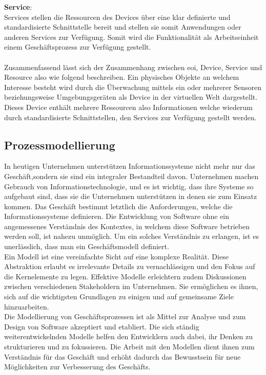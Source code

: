 \documentclass[a4paper, 12pt, twoside, headsepline=true]{scrartcl} %
\begin{document}
\textbf{Service}: \\
Services stellen die Ressourcen des Devices über eine klar definierte und standardisierte Schnittstelle bereit und stellen sie somit Anwendungen oder anderen Services zur Verfügung. Somit wird die Funktionalität als Arbeitseinheit einem Geschäftsprozess zur Verfügung gestellt.
\\
\\
Zusammenfassend lässt sich der Zusammenhang zwischen \ac{eoi}, Device, Service und Resource also wie folgend beschreiben. Ein physisches Objekte an welchem Interesse besteht wird durch die Überwachung mittels ein oder mehrerer Sensoren beziehungsweise Umgebungsgeräten als Device in der virtuellen Welt dargestellt. Dieses Device enthält mehrere Ressourcen also Informationen welche wiederum durch standardisierte Schnittstellen, den Services zur Verfügung gestellt werden.

\subsection{Prozessmodellierung}\label{modellierung}

In heutigen Unternehmen unterstützen Informationssysteme nicht mehr nur das Geschäft,sondern sie sind ein integraler Bestandteil davon. Unternehmen machen Gebrauch von Informationstechnologie, und es ist wichtig, dass ihre Systeme so aufgebaut sind, dass sie die Unternehmen unterstützen in denen sie zum Einsatz kommen. Das Geschäft bestimmt letztlich die Anforderungen, welche die Informationssysteme definieren. Die Entwicklung von Software ohne ein angemessenes Verständnis des Kontextes, in welchem diese Software betrieben werden soll, ist nahezu unmöglich. Um ein solches Verständnis zu erlangen, ist es unerlässlich, dass man ein Geschäftsmodell definiert.\\
 Ein Modell ist eine vereinfachte Sicht auf eine komplexe Realität. Diese Abstraktion erlaubt es irrelevante Details zu vernachlässigen und den Fokus auf die Kernelemente zu legen. Effektive Modelle erleichtern zudem
Diskussionen zwischen verschiedenen Stakeholdern im Unternehmen. Sie ermöglichen es ihnen, sich auf die wichtigsten Grundlagen zu einigen und auf gemeinsame Ziele hinzuarbeiten.\\
 Die Modellierung von Geschäftsprozessen ist als Mittel zur Analyse und zum Design von Software akzeptiert und etabliert. Die sich ständig weiterentwickelnden Modelle helfen den Entwicklern auch dabei, ihr Denken zu strukturieren und zu fokussieren. Die Arbeit mit den Modellen dient ihnen zum Verständnis für das Geschäft und erhöht dadurch das Bewusstsein für neue Möglichkeiten zur Verbesserung des Geschäfts.
\end{document}
